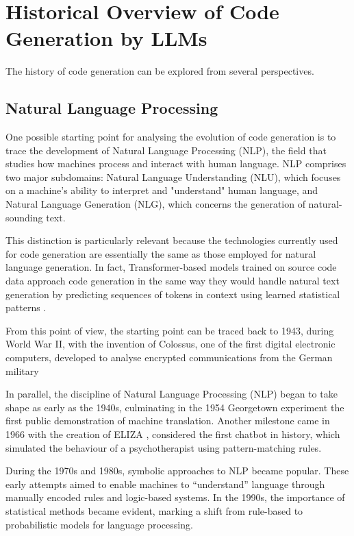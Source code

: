 \clearpage
\section{Historical Overview of Code Generation by LLMs}

The history of code generation can be explored from several 
perspectives. 

\subsection{Natural Language Processing} %
One possible starting point for 
analysing the evolution of code generation is to trace
the development of Natural Language Processing (NLP), 
the field that studies how machines process and interact 
with human language. NLP comprises two major subdomains: 
Natural Language Understanding (NLU), which focuses on a 
machine's ability to interpret and "understand" human language, 
and Natural Language Generation (NLG), which concerns the 
generation of natural-sounding text.

This distinction is particularly relevant because 
the technologies currently used for code generation 
are essentially the same as those employed for natural 
language generation. In fact, Transformer-based models 
trained on source code data approach code generation in 
the same way they would handle natural text generation 
by predicting sequences of tokens in context using learned 
statistical patterns \cite{vaswani2017attention}.

From this point of view, the starting point can be traced back to 1943, 
during World War II, with the invention of Colossus, one of the first digital 
electronic computers, developed to analyse encrypted communications from the 
German military

In parallel, the discipline of Natural Language Processing 
(NLP) began to take shape as early as the 1940s, culminating 
in the 1954 Georgetown experiment the first public demonstration 
of machine translation. Another milestone came in 1966 with the 
creation of ELIZA \cite{weizenbaum1966eliza}, considered the first 
chatbot in history, which simulated the behaviour of a psychotherapist 
using pattern-matching rules.

During the 1970s and 1980s, symbolic approaches to NLP became popular. 
These early attempts aimed to enable machines to “understand” language 
through manually encoded rules and logic-based systems. In the 1990s, 
the importance of statistical methods became evident, marking a shift 
from rule-based to probabilistic models for language processing.

